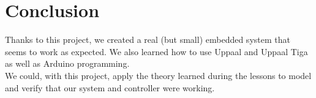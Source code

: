 
\section{Conclusion}
Thanks to this project, we created a real (but small) embedded system that seems to work as expected. We also learned how to use Uppaal and Uppaal Tiga as well as Arduino programming. \\
We could, with this project, apply the theory learned during the lessons to model and verify that our system and controller were working.
